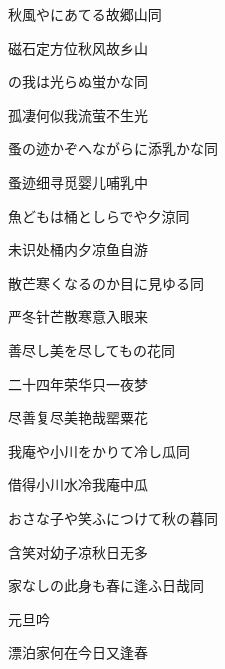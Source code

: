 \begin{haiku}
    {\FH 秋風やにあてる故郷山}\hfill{\FH 同}

    {\FK 磁石定方位秋风故乡山}
\end{haiku}

\begin{haiku}
    {\FH {}の我は光らぬ蛍かな}\hfill{\FH 同}

    {\FK 孤凄何似我流萤不生光}
\end{haiku}

\begin{haiku}
    {\FH 蚤の迹かぞへながらに添乳かな}\hfill{\FH 同}

    {\FK 蚤迹细寻觅婴儿哺乳中}
\end{haiku}

\begin{haiku}
    {\FH 魚どもは桶としらでや夕涼}\hfill{\FH 同}

    {\FK 未识处桶内夕凉鱼自游}
\end{haiku}

\begin{haiku}
    {\FH 散芒寒くなるのか目に見ゆる}\hfill{\FH 同}

    {\FK 严冬针芒散寒意入眼来}
\end{haiku}

\begin{haiku}
    {\FH 善尽し美を尽してもの花}\hfill{\FH 同}

    {\FK 二十四年荣华只一夜梦}

    {\FK 尽善复尽美艳哉罂粟花}
\end{haiku}

\begin{haiku}
    {\FH 我庵や小川をかりて冷し瓜}\hfill{\FH 同}

    {\FK 借得小川水冷我庵中瓜}
\end{haiku}

\begin{haiku}
    {\FH おさな子や笑ふにつけて秋の暮}\hfill{\FH 同}

    {\FK 含笑对幼子凉秋日无多}
\end{haiku}

\begin{haiku}
    {\FH 家なしの此身も春に逢ふ日哉}\hfill{\FH 同}

    {\FK 元旦吟}

    {\FK 漂泊家何在今日又逢春}
\end{haiku}

